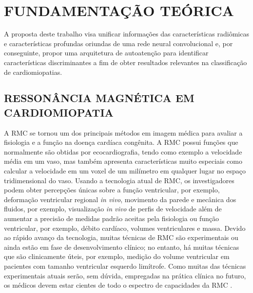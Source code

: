 \chapter{FUNDAMENTAÇÃO TEÓRICA}
\label{chap:fundamentacao_teorica}

A proposta deste trabalho visa unificar informações das características radiômicas e características profundas oriundas de uma rede neural convolucional e, por conseguinte, propor uma arquitetura de autoatenção para identificar características discriminantes a fim de obter resultados relevantes na classificação de cardiomiopatias.

\section{RESSONÂNCIA MAGNÉTICA EM CARDIOMIOPATIA}
\label{sec:rmc}

A \gls{RMC} se tornou um dos principais métodos em imagem médica para avaliar a fisiologia e a função na doença cardíaca congênita. A \gls{RMC} possui funções que normalmente são obtidas por ecocardiografia, tendo como exemplo a velocidade média em um vaso, mas também apresenta características muito especiais como calcular a velocidade em um voxel de um milímetro em qualquer lugar no espaço tridimensional do vaso.
Usando a tecnologia atual de \gls{RMC}, os investigadores podem obter percepções únicas sobre a função ventricular, por exemplo, deformação ventricular regional \textit{in vivo}, movimento da parede e mecânica dos fluidos, por exemplo, visualização \textit{in vivo} de perfis de velocidade além de aumentar a precisão de medidas padrão aceitas pela fisiologia ou função ventricular, por exemplo, débito cardíaco, volumes ventriculares e massa. Devido ao rápido avanço da tecnologia, muitas técnicas de \gls{RMC} são experimentais ou ainda estão em fase de desenvolvimento clínico; no entanto, há muitas técnicas que são clinicamente úteis, por exemplo, medição do volume ventricular em pacientes com tamanho ventricular esquerdo limítrofe. Como muitas das técnicas experimentais atuais serão, sem dúvida, empregadas na prática clínica no futuro, os médicos devem estar cientes de todo o espectro de capacidades da \gls{RMC} \cite{fogelAssessmentCardiacFunction2000}.


